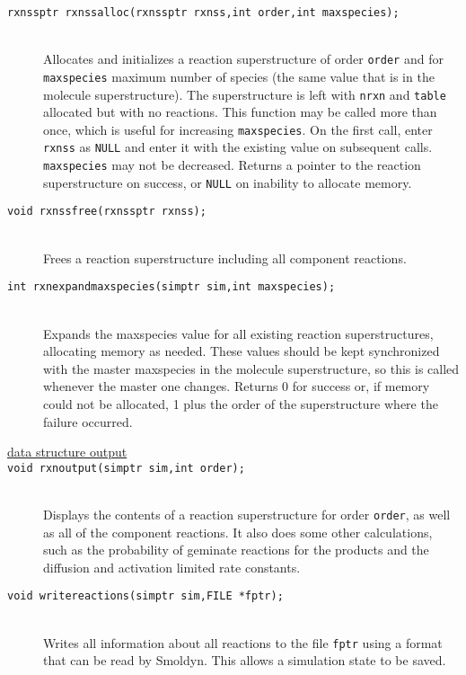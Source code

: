 \documentclass {book}
\begin{document}
\begin{description}
\item[\texttt{rxnssptr rxnssalloc(rxnssptr rxnss,int order,int maxspecies);}]
\hfill \\
Allocates and initializes a reaction superstructure of order \texttt{order} and for \texttt{maxspecies} maximum number of species (the same value that is in the molecule superstructure). The superstructure is left with \texttt{nrxn} and \texttt{table} allocated but with no reactions. This function may be called more than once, which is useful for increasing \texttt{maxspecies}. On the first call, enter \texttt{rxnss} as \texttt{NULL} and enter it with the existing value on subsequent calls. \texttt{maxspecies} may not be decreased. Returns a pointer to the reaction superstructure on success, or \texttt{NULL} on inability to allocate memory.

\item[\texttt{void rxnssfree(rxnssptr rxnss);}]
\hfill \\
Frees a reaction superstructure including all component reactions.

\item[\texttt{int rxnexpandmaxspecies(simptr sim,int maxspecies);}]
\hfill \\
Expands the maxspecies value for all existing reaction superstructures, allocating memory as needed. These values should be kept synchronized with the master maxspecies in the molecule superstructure, so this is called whenever the master one changes. Returns 0 for success or, if memory could not be allocated, 1 plus the order of the superstructure where the failure occurred.

\item[\underline{data structure output}]

\item[\texttt{void rxnoutput(simptr sim,int order);}]
\hfill \\
Displays the contents of a reaction superstructure for order \texttt{order}, as well as all of the component reactions. It also does some other calculations, such as the probability of geminate reactions for the products and the diffusion and activation limited rate constants.

\item[\texttt{void writereactions(simptr sim,FILE *fptr);}]
\hfill \\
Writes all information about all reactions to the file \texttt{fptr} using a format that can be read by Smoldyn. This allows a simulation state to be saved.


\end{description}
\end{document}
